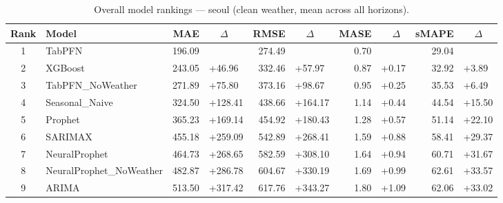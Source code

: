 \begin{table}[ht!]
\centering
\caption{Overall model rankings — seoul (clean weather, mean across all horizons).}
\label{tab:overall_rankings_seoul}
{\small
\setlength{\tabcolsep}{3pt}
\scriptsize
\begin{tabular}{clrlrlrlrl}
\toprule
Rank & Model & MAE & ~~\(\Delta\) & RMSE & ~~\(\Delta\) & MASE & ~~\(\Delta\) & sMAPE & ~~\(\Delta\) \\
\midrule
1 & TabPFN & 196.09 &  & 274.49 &  & 0.70 &  & 29.04 &  \\
2 & XGBoost & 243.05 & +46.96 & 332.46 & +57.97 & 0.87 & +0.17 & 32.92 & +3.89 \\
3 & TabPFN_NoWeather & 271.89 & +75.80 & 373.16 & +98.67 & 0.95 & +0.25 & 35.53 & +6.49 \\
4 & Seasonal_Naive & 324.50 & +128.41 & 438.66 & +164.17 & 1.14 & +0.44 & 44.54 & +15.50 \\
5 & Prophet & 365.23 & +169.14 & 454.92 & +180.43 & 1.28 & +0.57 & 51.14 & +22.10 \\
6 & SARIMAX & 455.18 & +259.09 & 542.89 & +268.41 & 1.59 & +0.88 & 58.41 & +29.37 \\
7 & NeuralProphet & 464.73 & +268.65 & 582.59 & +308.10 & 1.64 & +0.94 & 60.71 & +31.67 \\
8 & NeuralProphet_NoWeather & 482.87 & +286.78 & 604.67 & +330.19 & 1.69 & +0.99 & 62.61 & +33.57 \\
9 & ARIMA & 513.50 & +317.42 & 617.76 & +343.27 & 1.80 & +1.09 & 62.06 & +33.02 \\
\bottomrule
\end{tabular}
}
\end{table}
